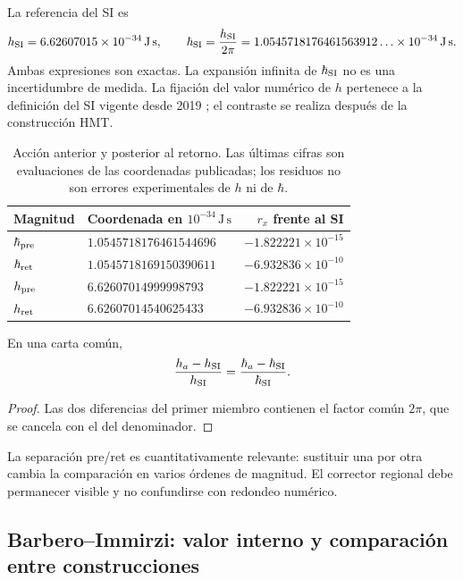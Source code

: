 La referencia del SI es
\[
 h_{\rm SI}=6.62607015\times10^{-34}\,\mathrm{J\,s},\qquad
 \hbar_{\rm SI}=\frac{h_{\rm SI}}{2\pi}
 =1.0545718176461563912\ldots\times10^{-34}\,\mathrm{J\,s}.
\]
Ambas expresiones son exactas. La expansión infinita de \(\hbar_{\rm SI}\)
no es una incertidumbre de medida. La fijación del valor numérico de
\(h\) pertenece a la definición del SI vigente desde 2019
\cite{ii:bipm2018}; el contraste se realiza después de la construcción HMT.

\begin{table}[htbp]
\centering\small
\setlength{\tabcolsep}{5pt}
\begin{tabular}{@{}llr@{}}
\toprule
Magnitud & Coordenada en \(10^{-34}\,\mathrm{J\,s}\) & \(r_x\) frente al SI\\
\midrule
\(\hbar_{\rm pre}\) & \(1.0545718176461544696\) & \(-1.822221\times10^{-15}\)\\
\(\hbar_{\rm ret}\) & \(1.0545718169150390611\) & \(-6.932836\times10^{-10}\)\\
\(h_{\rm pre}\) & \(6.62607014999998793\) & \(-1.822221\times10^{-15}\)\\
\(h_{\rm ret}\) & \(6.62607014540625433\) & \(-6.932836\times10^{-10}\)\\
\bottomrule
\end{tabular}
\caption{Acción anterior y posterior al retorno. Las últimas cifras son
evaluaciones de las coordenadas publicadas; los residuos no son errores
experimentales de \(h\) ni de \(\hbar\).}
\label{ii:tab:ii-planck-comparacion}
\end{table}

\begin{proposition}
En una carta común,
\[
 \frac{h_a-h_{\rm SI}}{h_{\rm SI}}
 =\frac{\hbar_a-\hbar_{\rm SI}}{\hbar_{\rm SI}}.
\]
\end{proposition}
\begin{proof}
Las dos diferencias del primer miembro contienen el factor común
\(2\pi\), que se cancela con el del denominador.
\end{proof}
La separación pre/ret es cuantitativamente relevante: sustituir una por
otra cambia la comparación en varios órdenes de magnitud. El corrector
regional debe permanecer visible y no confundirse con redondeo numérico.

\subsection{Barbero--Immirzi: valor interno y comparación entre construcciones}

